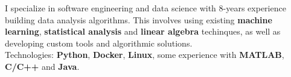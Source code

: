 \begin{cventries}
    \begin{flushleft}
        \bodyfont
        I specialize in software engineering and data science with 8-years
        experience building data analysis algorithms. This
        involves using existing \textbf{machine learning},
        \textbf{statistical analysis} and \textbf{linear algebra} techinques, as well as
        developing custom tools and algorithmic solutions.\\
        Technologies: \textbf{Python}, \textbf{Docker}, \textbf{Linux}, some experience with \textbf{MATLAB}, \textbf{C/C++} and
        \textbf{Java}.
    \end{flushleft}
\end{cventries}
